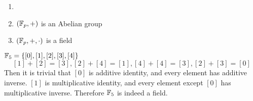 \begin{lemma}
    \begin{enumerate}
        \item[]
        \item \((\mathbb{F}_p, +)\) is an Abelian group
        \item \((\mathbb{F}_p, +, \cdot)\) is a field
    \end{enumerate}
\end{lemma}

\begin{example}
    \(\mathbb{F}_5 = \{[0], [1], [2], [3], [4]\}\)
    \[
        [1] + [2] = [3], [2] + [4] = [1], [4] + [4] = [3], [2] + [3] = [0]
    \]
    Then it is trivial that \([0]\) is additive identity, and every element has additive inverse. \([1]\) is multiplicative identity, and every element except \([0]\) has multiplicative inverse. Therefore \(\mathbb{F}_5\) is indeed a field.
\end{example}
